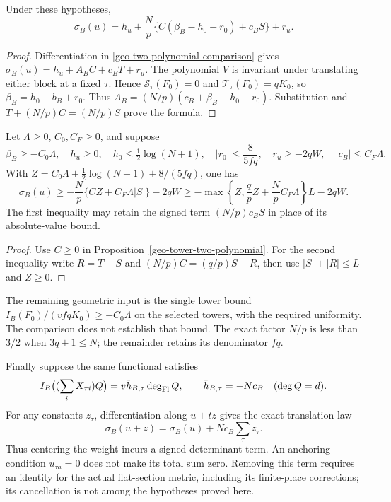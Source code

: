 \begin{proposition}
\label{geo-tower-two-polynomial}
Under these hypotheses,
\[
 \boxed{\quad
 \sigma_B(u)=h_u+\frac Np
       \{C(\beta_B-h_0-r_0)+c_BS\}+r_u.\quad}
\]
\end{proposition}

\begin{proof}
Differentiation in \eqref{geo-two-polynomial-comparison} gives
$\sigma_B(u)=h_u+A_BC+c_BT+r_u$.
The polynomial $V$ is invariant under translating either block at
a fixed $\tau$. Hence $\mathcal S_\tau(F_0)=0$ and
$\mathcal T_\tau(F_0)=qK_0$, so $\beta_B=h_0-b_B+r_0$.
Thus $A_B=(N/p)(c_B+\beta_B-h_0-r_0)$. Substitution and
$T+(N/p)C=(N/p)S$ prove the formula.
\end{proof}

\begin{corollary}\label{geo-tower-block-bound}
Let $\Lambda\ge0$, $C_0,C_F\ge0$, and suppose
\[
 \beta_B\ge-C_0\Lambda,\quad
 h_u\ge0,\quad h_0\le\tfrac12\log(N+1),\quad
 |r_0|\le\frac8{5fq},\quad r_u\ge-2qW,\quad |c_B|\le C_F\Lambda.
\]
With $Z=C_0\Lambda+\tfrac12\log(N+1)+8/(5fq)$, one has
\[
 \sigma_B(u)\ge-\frac Np\{CZ+C_F\Lambda|S|\}-2qW
 \ge-\max\left\{Z,\frac qpZ+\frac Np C_F\Lambda\right\}L-2qW.
\]
The first inequality may retain the signed term $(N/p)c_BS$
in place of its absolute-value bound.
\end{corollary}

\begin{proof}
Use $C\ge0$ in Proposition~\ref{geo-tower-two-polynomial}.
For the second inequality write $R=T-S$ and
$(N/p)C=(q/p)S-R$, then use $|S|+|R|\le L$ and $Z\ge0$.
\end{proof}

The remaining geometric input is the single lower bound
$I_B(F_0)/(vfqK_0)\ge-C_0\Lambda$ on the selected towers, with the
required uniformity. The comparison does not establish that bound.
The exact factor $N/p$ is less than $3/2$ when $3q+1\le N$;
the remainder retains its denominator $fq$.

Finally suppose the same functional satisfies
\[
 I_B\bigl((\sum_iX_{\tau i})Q\bigr)
   =v\bar h_{B,\tau}\deg_{\rm Fl}Q,\qquad
 \bar h_{B,\tau}=-Nc_B
 \quad(\deg Q=d).
\]
For any constants $z_\tau$, differentiation along $u+tz$ gives the
exact translation law
\[
             \sigma_B(u+z)=\sigma_B(u)+Nc_B\sum_\tau z_\tau.
\]
Thus centering the weight incurs a signed determinant term. An
anchoring condition $u_{\tau a}=0$ does not make its total sum zero.
Removing this term requires an identity for the actual flat-section
metric, including its finite-place corrections; its cancellation is
not among the hypotheses proved here.
